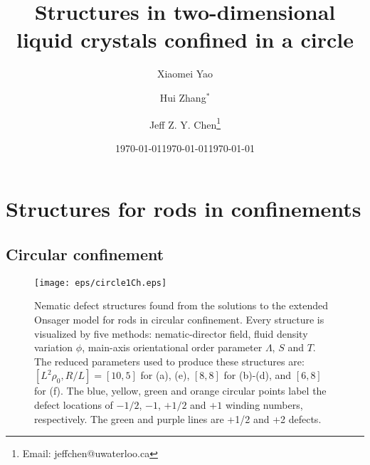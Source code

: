 \documentclass[prl,twocolumn,preprintnumbers,reprint]{revtex4}
\begin{document}

\title{Structures in two-dimensional liquid crystals confined in a circle
}

\author{Xiaomei Yao}
\date{\today}
\author{Hui Zhang$^*$}
\date{\today}
\author{Jeff Z. Y. Chen\footnote{Email: jeffchen@uwaterloo.ca}}
\date{\today}

\begin{abstract}

\end{abstract}

\maketitle

\clearpage




\section{Structures for rods in confinements}
\subsection{Circular confinement}
\begin{figure}[!t]\centering
\texttt{[image: eps/circle1Ch.eps]}
\caption{Nematic defect structures found from the solutions to the extended Onsager model for rods in circular confinement. Every structure is visualized by five methods: nematic-director field, fluid density variation $\phi$, main-axis orientational order parameter $\Lambda$, $S$ and $T$. The reduced parameters used to produce these structures are: $[L^2 \rho_0, R/L]  = [10, 5]$ for (a), (e), $[8, 8]$ for (b)-(d), and $[6, 8]$ for (f). The blue, yellow, green and orange circular points label the defect locations of $-1/2$, $-1$, $+1/2$ and $+1$ winding numbers, respectively. The green and purple lines are +1/2 and +2 defects.} \label{P1}
\end{figure}
\end{document}
